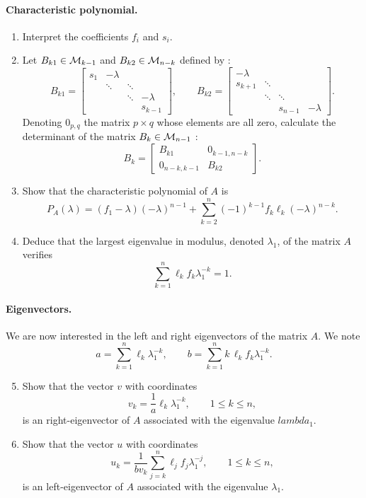 \paragraph{Characteristic polynomial.}
\begin{enumerate}
  \item Interpret the coefficients $f_i$ and $s_i$.
  \item Let $B_{k1} \in \mathcal{M}_{k-1}$ and $B_{k2} \in \mathcal{M}_{n-k}$ defined by :
  $$
  B_{k1} = \left[\begin{array}{cccc}
            s_1 & -\lambda & &  \\
            & \ddots & \ddots & \\
            & & \ddots & -\lambda \\
            & & & s_{k-1}
          \end{array}\right], \qquad
  B_{k2} = \left[\begin{array}{cccc}
            -\lambda & & & \\
            s_{k+1} & \ddots & & \\
            & \ddots & \ddots & \\
            & & s_{n-1} & -\lambda
          \end{array}\right].
  $$
  Denoting $0_{p,q}$ the matrix $p \times q$ whose elements are all zero, calculate the determinant of the matrix $B_k \in \mathcal{M}_{n-1}$ :
  $$
  B_k = \left[\begin{array}{cc}
            B_{k1} & 0_{k-1, n-k} \\
            0_{n-k, k-1} & B_{k2}
          \end{array}\right].
  $$
  \item Show that the characteristic polynomial of $A$ is
  $$
  P_A(\lambda) = (f_1 - \lambda) (-\lambda)^{n-1} + \sum_{k=2}^{n} (-1)^{k-1} f_k \ell_k (-\lambda)^{n-k}.
  $$
  \item Deduce that the largest eigenvalue in modulus, denoted $\lambda_1$, of the matrix $A$ verifies
  $$
  \sum_{k=1}^n \ell_k f_k \lambda_1^{-k} = 1.
  $$
\end{enumerate}

\paragraph{Eigenvectors.}
We are now interested in the left and right eigenvectors of the matrix $A$. We note $$
a = \sum_{k=1}^n \ell_k \lambda_1^{-k}, \qquad
b = \sum_{k=1}^n k \, \ell_k f_k \lambda_1^{-k}.
$$
\begin{enumerate}
  \setcounter{enumi}{4}
  \item Show that the vector $v$ with coordinates
  $$
  v_k = \frac1a \ell_k \lambda_1^{-k}, \qquad 1 \leq k \leq n,
  $$
  is an right-eigenvector of $A$ associated with the eigenvalue $lambda_1$.
  \item Show that the vector $u$ with coordinates
  $$
  u_k = \frac1{b v_k} \sum_{j=k}^n \ell_j f_j \lambda_1^{-j}, \qquad 1 \leq k \leq n,
  $$
  is an left-eigenvector of $A$ associated with the eigenvalue $\lambda_1$.
\end{enumerate}

